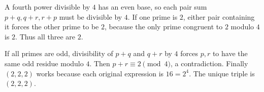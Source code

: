 A fourth power divisible by $4$ has an even base, so each pair sum $p+q,q+r,r+p$ must be divisible by $4$. If one prime is $2$, either pair containing it forces the other prime to be $2$, because the only prime congruent to $2$ modulo $4$ is $2$. Thus all three are $2$.

If all primes are odd, divisibility of $p+q$ and $q+r$ by $4$ forces $p,r$ to have the same odd residue modulo $4$. Then $p+r\equiv2\pmod4$, a contradiction. Finally $(2,2,2)$ works because each original expression is $16=2^4$. The unique triple is $\boxed{(2,2,2)}$.
